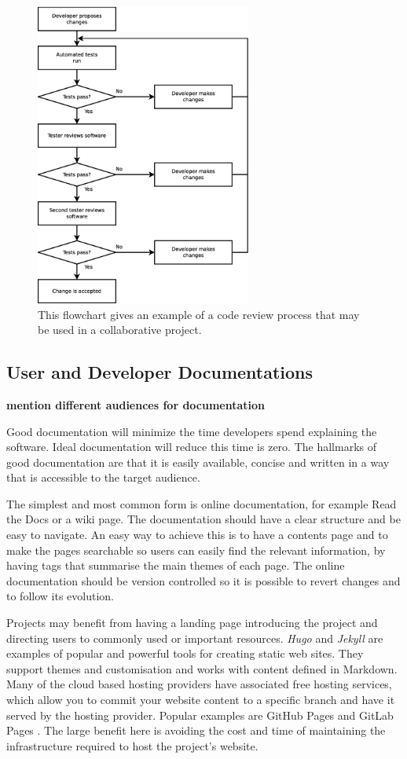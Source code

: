 \documentclass[jnr]{iosart2x}
\newcommand{\todo}[1]{\textbf{#1}}
\begin{document}
\begin{figure}
    \centering
    \includegraphics[height=10cm]{code_review_process.eps}
    \caption{This flowchart gives an example of a code review process that may be used in a collaborative project.}
    \label{Code_Review_Process}
\end{figure}

\subsection{User and Developer Documentations}
\label{Documentation}

\todo{mention different audiences for documentation}

Good documentation will minimize the time developers spend explaining the software.
Ideal documentation will reduce this time is zero.
The hallmarks of good documentation are that it is easily available, concise and written in a way that is accessible to the target audience.

The simplest and most common form is online documentation, for example Read the Docs \cite{Read_The_Docs} or a wiki page.
The documentation should have a clear structure and be easy to navigate.
An easy way to achieve this is to have a contents page and to make the pages searchable so users can easily find the relevant information, by having tags that summarise the main themes of each page.
The online documentation should be version controlled so it is possible to revert changes and to follow its evolution.

Projects may benefit from having a landing page introducing the project and directing users to commonly used or important resources.
{\it Hugo} \cite{Hugo} and {\it Jekyll} \cite{Jekyll} are examples of popular and powerful tools for creating static web sites.
They support themes and customisation and works with content defined in Markdown.
Many of the cloud based hosting providers have associated free hosting services, which allow you to commit your website content to a specific branch and have it served by the hosting provider.
Popular examples are GitHub Pages \cite{GitHub_Pages} and GitLab Pages \cite{GitLab_Pages}.
The large benefit here is avoiding the cost and time of maintaining the infrastructure required to host the project's website.
\end{document}
